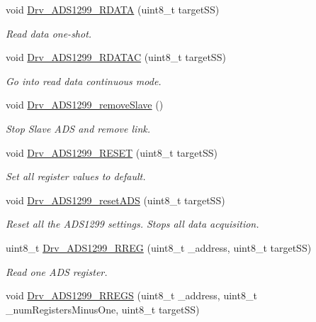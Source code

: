 \begin{DoxyCompactItemize}
void \hyperlink{group__ADS1299__Library_ga722cebf27d20f3d52ac205c1de4c9c89}{Drv\+\_\+\+A\+D\+S1299\+\_\+\+R\+D\+A\+TA} (uint8\+\_\+t target\+SS)
\begin{DoxyCompactList}\small\item\em Read data one-\/shot. \end{DoxyCompactList}\item 
void \hyperlink{group__ADS1299__Library_ga51676dbe90976a582680808c7f32eadc}{Drv\+\_\+\+A\+D\+S1299\+\_\+\+R\+D\+A\+T\+AC} (uint8\+\_\+t target\+SS)
\begin{DoxyCompactList}\small\item\em Go into read data continuous mode. \end{DoxyCompactList}\item 
void \hyperlink{group__ADS1299__Library_gab6a161f709334920b4f69156fe0ce928}{Drv\+\_\+\+A\+D\+S1299\+\_\+remove\+Slave} ()
\begin{DoxyCompactList}\small\item\em Stop Slave A\+DS and remove link. \end{DoxyCompactList}\item 
void \hyperlink{group__ADS1299__Library_ga33a611c58e5bd53c062d118be8a09d9e}{Drv\+\_\+\+A\+D\+S1299\+\_\+\+R\+E\+S\+ET} (uint8\+\_\+t target\+SS)
\begin{DoxyCompactList}\small\item\em Set all register values to default. \end{DoxyCompactList}\item 
void \hyperlink{group__ADS1299__Library_gaf00abe725d1194171c9b84ab1c9aa356}{Drv\+\_\+\+A\+D\+S1299\+\_\+reset\+A\+DS} (uint8\+\_\+t target\+SS)
\begin{DoxyCompactList}\small\item\em Reset all the A\+D\+S1299 settings. Stops all data acquisition. \end{DoxyCompactList}\item 
uint8\+\_\+t \hyperlink{group__ADS1299__Library_ga1c03d79e9a6080ed2de6916b1dd47849}{Drv\+\_\+\+A\+D\+S1299\+\_\+\+R\+R\+EG} (uint8\+\_\+t \+\_\+address, uint8\+\_\+t target\+SS)
\begin{DoxyCompactList}\small\item\em Read one A\+DS register. \end{DoxyCompactList}\item 
void \hyperlink{group__ADS1299__Library_gae5ee6c66ba40e661985018da02f4683d}{Drv\+\_\+\+A\+D\+S1299\+\_\+\+R\+R\+E\+GS} (uint8\+\_\+t \+\_\+address, uint8\+\_\+t \+\_\+num\+Registers\+Minus\+One, uint8\+\_\+t target\+SS)

\end{DoxyCompactItemize}
